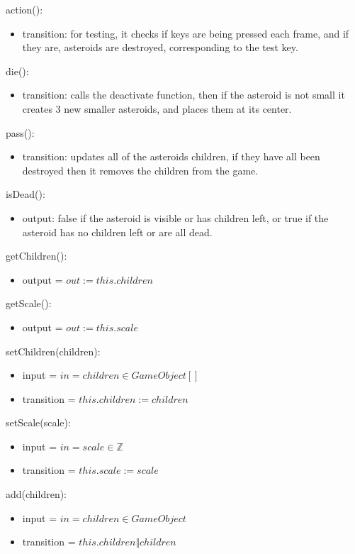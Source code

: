 \documentclass[12pt]{article}
\begin{document}
action():
\begin{itemize}
    \item transition: for testing, it checks if keys are being pressed each frame, and if they are, asteroids are destroyed, corresponding to the test key.
\end{itemize}

die():
\begin{itemize}
    \item transition: calls the deactivate function, then if the asteroid is not small it creates 3 new smaller asteroids, and places them at its center.
\end{itemize}

pass():
\begin{itemize}
    \item transition: updates all of the asteroids children, if they have all been destroyed then it removes the children from the game. 
\end{itemize}

isDead():
\begin{itemize}
    \item output: false if the asteroid is visible or has children left, or true if the asteroid has no children left or are all dead.
\end{itemize}

getChildren():
\begin{itemize}
    \item output = $out := this.children$
\end{itemize}

getScale():
\begin{itemize}
    \item output = $out := this.scale$
\end{itemize}

setChildren(children):
\begin{itemize}
    \item input = $in = children \in GameObject[]$
    \item transition = $this.children := children$
\end{itemize}

setScale(scale):
\begin{itemize}
    \item input = $in = scale \in \mathbb{Z}$
    \item transition = $this.scale := scale$
\end{itemize}

add(children):
\begin{itemize}
    \item input = $in = children \in GameObject$
    \item transition = $this.children \Vert children$
\end{itemize}
\end{document}
